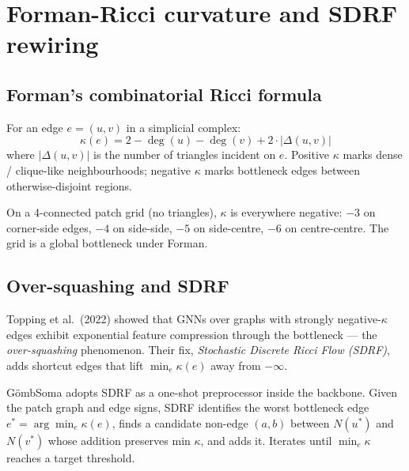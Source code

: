 \documentclass[11pt,a4paper]{article}
\newcommand{\GS}{G\"ombSoma}
\begin{document}
\section{Forman-Ricci curvature and SDRF rewiring}

\subsection{Forman's combinatorial Ricci formula}

For an edge $e = (u, v)$ in a simplicial complex:
\[
\kappa(e) = 2 - \deg(u) - \deg(v) + 2 \cdot |\Delta(u, v)|
\]
where $|\Delta(u, v)|$ is the number of triangles incident on $e$.
Positive $\kappa$ marks dense / clique-like neighbourhoods;
negative $\kappa$ marks bottleneck edges between otherwise-disjoint
regions.

On a 4-connected patch grid (no triangles), $\kappa$ is everywhere
negative: $-3$ on corner-side edges, $-4$ on side-side, $-5$ on
side-centre, $-6$ on centre-centre. The grid is a global
bottleneck under Forman.

\subsection{Over-squashing and SDRF}

Topping et al.\ (2022) showed that GNNs over graphs with strongly
negative-$\kappa$ edges exhibit exponential feature compression
through the bottleneck — the \emph{over-squashing} phenomenon. Their
fix, \emph{Stochastic Discrete Ricci Flow (SDRF)}, adds shortcut
edges that lift $\min_e \kappa(e)$ away from $-\infty$.

\GS{} adopts SDRF as a one-shot preprocessor inside the backbone.
Given the patch graph and edge signs, SDRF identifies the worst
bottleneck edge $e^* = \arg\min_e \kappa(e)$, finds a candidate
non-edge $(a, b)$ between $N(u^*)$ and $N(v^*)$ whose addition
preserves min $\kappa$, and adds it. Iterates until $\min_e \kappa$
reaches a target threshold.
\end{document}

